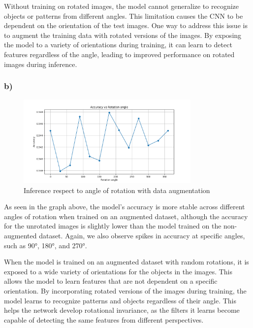 \documentclass{article}
\begin{document}
Without training on rotated images, the model cannot generalize to recognize objects or patterns from different angles.
This limitation causes the CNN to be dependent on the orientation of the test images. One way to address this issue is to
augment the training data with rotated versions of the images. By exposing the model to a variety of orientations during training,
it can learn to detect features regardless of the angle, leading to improved performance on rotated images during inference.

\subsubsection*{b)}

\begin{figure}[H]
    \centering
    \includegraphics[width=0.8\textwidth]{images/rot_angles_aug.png}
    \caption{Inference respect to angle of rotation with data augmentation}
    \label{fig:angle_inference_aug}
\end{figure}

As seen in the graph above, the model's accuracy is more stable across different angles of rotation when trained on an augmented dataset, although
the accuracy for the unrotated images is slightly lower than the model trained on the non-augmented dataset. Again, we also observe
spikes in accuracy at specific angles, such as 90°, 180°, and 270°.

When the model is trained on an augmented dataset with random rotations, it is exposed to a wide variety of orientations for
the objects in the images. This allows the model to learn features that are not dependent on a specific orientation. By
incorporating rotated versions of the images during training, the model learns to recognize patterns and objects regardless
of their angle. This helps the network develop rotational invariance, as the filters it learns become capable of detecting
the same features from different perspectives.
\end{document}
